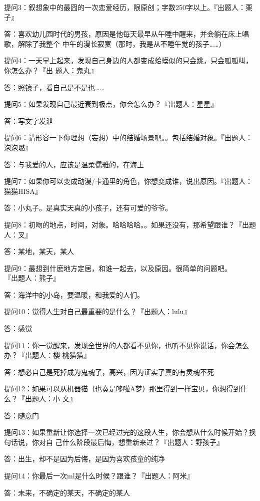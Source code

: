 \documentclass[12pt,a4paper]{article}
\def\blankrev{\vspace{1ex}}									%
\begin{document}
		\blankrev
		提问3：叙想象中的最囧的一次恋爱经历，限原创；字数250字以上。『出题人：栗子』\par
		答：喜欢幼儿园时代的男孩，原因是他每天最早从午睡中醒来，并会躺在床上唱歌，解除了我整个
			中午的漫长寂寞（那时，我是从不睡午觉的孩子……）

		\blankrev
		提问4：一天早上起来，发现自己身边的人都变成蛤蟆似的只会跳，只会呱呱叫，你怎么办？『出
				题人：鬼丸』\par
		答：照镜子，看自己是不是也……

		\blankrev
		提问5：如果发现自己最近衰到极点，你会怎么办？『出题人：星星』\par
		答：写文字发泄

		\blankrev
		提问6：请形容一下你理想（妄想）中的结婚场景吧。。包括结婚对象。『出题人：泡泡璐』\par
		答：与我爱的人，应该是温柔儒雅的，在海上

		\blankrev
		提问7：如果你可以变成动漫/卡通里的角色，你想变成谁，说出原因。『出题人：猫猫HISA』\par
		答：小丸子。是真实天真的小孩子，还有可爱的爷爷。

		\blankrev
		提问8：初吻的地点，时间，对象。哈哈哈哈。。如果还没有，那希望跟谁？『出题人：叉』\par
		答：某地，某天，某人

		\blankrev
		提问9：最想到什麽地方定居，和谁一起去，以及原因。很简单的问题吧。\\『出题人：熊子』\par
		答：海洋中的小岛，要温暖，和我爱的人们。

		\blankrev
		提问10：觉得人生对自己最重要的是什么？『出题人：lulu』\par
		答：感觉

		\blankrev
		提问11：你一觉醒来，发现全世界的人都看不见你，也听不见你说话，你会怎么办？『出题人：樱
				桃猫猫』\par
		答：想必自己是死掉成为鬼魂了，高兴，因为证实了真的有灵魂不死

		\blankrev
		提问12：如果可以从机器猫（也奏是哆啦A梦）那里得到一样宝贝，你想得到什么？『出题人：小
				文』\par
		答：随意门

		\blankrev
		提问13：如果重新让你选择一次已经过完的这段人生，你会想从什么时候开始？换句话说，你对自
				己什么阶段最后悔，想重新来过？『出题人：野孩子』\par
		答：出生，却不是因为后悔，是因为喜欢孩童的纯净

		\blankrev
		提问14：你最后一次ml是什么时候？跟谁？『出题人：阿米』\par
		答：未来，不确定的某天，不确定的某人
\end{document}
